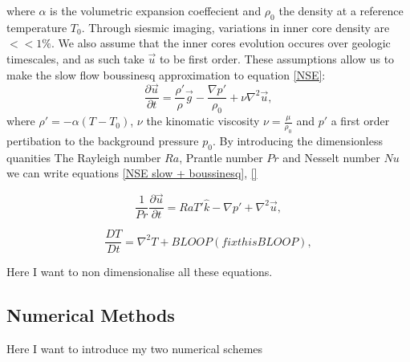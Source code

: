 \documentclass{article}
\begin{document}
where $\alpha$ is the volumetric expansion coeffecient and $\rho_0$ the density at a reference temperature $T_0$.
Through siesmic imaging, variations in inner core density are $<< 1 \%$. We also assume that the inner cores evolution occures over geologic timescales, and as such take $\vec{u}$ to be first order. These assumptions allow us to make the slow flow boussinesq approximation to equation \ref{NSE}:
\begin{equation}
	\frac{\partial \vec{u}}{\partial t} = \frac{\rho'}{\rho} \vec{g} -   \frac{\nabla p'}{\rho_0} + \nu \nabla^2 \vec{u},
	\label{NSE slow + boussinesq}
\end{equation}
where $\rho'=-\alpha(T - T_0)$, $\nu$ the kinomatic viscosity $\nu = \frac{\mu}{\rho_0}$ and $p'$ a first order pertibation to the background pressure $p_0$.
\newline
By introducing the dimensionless quanities The Rayleigh number $Ra$, Prantle number $Pr$ and Nesselt number $Nu$ we can write equations \ref{NSE slow + boussinesq}, \ref{}



\begin{equation}
	\frac{1}{Pr} \frac{\partial \vec{u}}{\partial t} = Ra T' \hat{k} - \nabla p' + \nabla^2 \vec{u},
	\label{NSE slow + boussinesq + Non Dimensional}
\end{equation}



\begin{equation}
	\frac{D T}{D t} = \nabla^2 T + BLOOP (fix this BLOOP),
	\label{adeT + Non Dimensional}
\end{equation}

Here I want to non dimensionalise all these equations.














\subsection*{Numerical Methods}
Here I want to introduce my two numerical schemes
\end{document}
